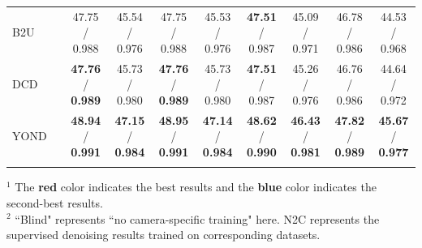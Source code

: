\documentclass[lettersize,journal]{IEEEtran}
\begin{document}
\begin{table}[t]
\begin{tabular}{l|c|cc|cc|cc|cc}
				B2U~\cite{CVPR22/B2U} & \CheckmarkBold & {47.75} / {0.988} & {45.54} / {0.976} & {47.75} / {0.988} & {45.53} / {0.976} & \textbf{\color{blue}47.51} / {0.987} & {45.09} / {0.971} & {46.78} / {0.986} & {44.53} / {0.968}\\
				DCD~\cite{ICCV23/DCD} & \CheckmarkBold & \textbf{\color{blue}47.76} / \textbf{\color{blue}0.989} & {45.73} / {0.980} & \textbf{\color{blue}47.76} / \textbf{\color{blue}0.989} & {45.73} / {0.980} & \textbf{\color{blue}47.51} / {0.987} & {45.26} / {0.976} & {46.76} / {0.986} & {44.64} / {0.972}\\
				YOND & \CheckmarkBold & \textbf{\color{red}48.94} / \textbf{\color{red}0.991} & \textbf{\color{red}47.15} / \textbf{\color{red}0.984} & \textbf{\color{red}48.95} / \textbf{\color{red}0.991} & \textbf{\color{red}47.14} / \textbf{\color{red}0.984} & \textbf{\color{red}48.62} / \textbf{\color{red}0.990} & \textbf{\color{red}46.43} / \textbf{\color{blue}0.981} & \textbf{\color{red}47.82} / \textbf{\color{blue}0.989} & \textbf{\color{blue}45.67} / \textbf{\color{blue}0.977}\\
				\Xhline{0.8pt}
			\end{tabular}
			\begin{flushleft}
				$^1$ The \textbf{\color{red}red} color indicates the best results and the \textbf{\color{blue}blue} color indicates the second-best results. \\
				$^2$ ``Blind" represents ``no camera-specific training" here. N2C represents the supervised denoising results trained on corresponding datasets.
			\end{flushleft}
		\vspace{-6pt}
	\end{table}
	
\end{document}
